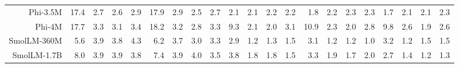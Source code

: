 \documentclass[letterpaper]{article}
\begin{document}
\begin{table}[t]
{\begin{tabular}{rrrrr|rrrr|rrrr|rrrr|rrrr}
Phi-3.5M & \cellcolor[HTML]{CEE8CC}17.4 & \cellcolor[HTML]{F9D4CC}2.7 & \cellcolor[HTML]{F9D3CC}2.6 & \cellcolor[HTML]{FAD4CC}2.9 & \cellcolor[HTML]{CEE8CC}17.9 & \cellcolor[HTML]{FAD4CC}2.9 & \cellcolor[HTML]{F9D3CC}2.5 & \cellcolor[HTML]{F9D4CC}2.7 & \cellcolor[HTML]{FAD8CC}2.1 & \cellcolor[HTML]{FAD9CC}2.1 & \cellcolor[HTML]{FBDACC}2.2 & \cellcolor[HTML]{FBDACC}2.2 & \cellcolor[HTML]{FAD7CC}1.8 & \cellcolor[HTML]{FBDACC}2.2 & \cellcolor[HTML]{FBDBCC}2.3 & \cellcolor[HTML]{FBDBCC}2.3 & \cellcolor[HTML]{FAD7CC}1.7 & \cellcolor[HTML]{FBDACC}2.1 & \cellcolor[HTML]{FBDACC}2.1 & \cellcolor[HTML]{FBDCCC}2.3 \\
Phi-4M & \cellcolor[HTML]{CCE8CC}17.7 & \cellcolor[HTML]{FAD6CC}3.3 & \cellcolor[HTML]{FAD6CC}3.1 & \cellcolor[HTML]{FAD7CC}3.4 & \cellcolor[HTML]{CCE8CC}18.2 & \cellcolor[HTML]{FAD6CC}3.2 & \cellcolor[HTML]{F9D4CC}2.8 & \cellcolor[HTML]{FAD6CC}3.3 & \cellcolor[HTML]{CCE8CC}9.3 & \cellcolor[HTML]{FAD9CC}2.1 & \cellcolor[HTML]{FAD7CC}2.0 & \cellcolor[HTML]{FCE1CC}3.1 & \cellcolor[HTML]{CCE8CC}10.9 & \cellcolor[HTML]{FBDBCC}2.3 & \cellcolor[HTML]{FAD8CC}2.0 & \cellcolor[HTML]{FBDFCC}2.8 & \cellcolor[HTML]{CCE8CC}9.8 & \cellcolor[HTML]{FBDECC}2.6 & \cellcolor[HTML]{FAD8CC}1.9 & \cellcolor[HTML]{FBDECC}2.6 \\
SmolLM-360M & \cellcolor[HTML]{FCE1CC}5.6 & \cellcolor[HTML]{FAD9CC}3.9 & \cellcolor[HTML]{FAD9CC}3.8 & \cellcolor[HTML]{FBDBCC}4.3 & \cellcolor[HTML]{FCE3CC}6.2 & \cellcolor[HTML]{FAD8CC}3.7 & \cellcolor[HTML]{FAD5CC}3.0 & \cellcolor[HTML]{FAD6CC}3.3 & \cellcolor[HTML]{FCE0CC}2.9 & \cellcolor[HTML]{F9D1CC}1.2 & \cellcolor[HTML]{F9D1CC}1.3 & \cellcolor[HTML]{F9D4CC}1.5 & \cellcolor[HTML]{FCE1CC}3.1 & \cellcolor[HTML]{F9D3CC}1.2 & \cellcolor[HTML]{F9D3CC}1.2 & \cellcolor[HTML]{F9D2CC}1.0 & \cellcolor[HTML]{FCE3CC}3.2 & \cellcolor[HTML]{F9D3CC}1.2 & \cellcolor[HTML]{FAD5CC}1.5 & \cellcolor[HTML]{FAD5CC}1.5 \\
SmolLM-1.7B & \cellcolor[HTML]{FEECCC}8.0 & \cellcolor[HTML]{FAD9CC}3.9 & \cellcolor[HTML]{FAD9CC}3.9 & \cellcolor[HTML]{FAD9CC}3.8 & \cellcolor[HTML]{FDE8CC}7.4 & \cellcolor[HTML]{FAD9CC}3.9 & \cellcolor[HTML]{FAD9CC}4.0 & \cellcolor[HTML]{FAD7CC}3.5 & \cellcolor[HTML]{FDE7CC}3.8 & \cellcolor[HTML]{FAD5CC}1.8 & \cellcolor[HTML]{FAD6CC}1.8 & \cellcolor[HTML]{F9D3CC}1.5 & \cellcolor[HTML]{FCE2CC}3.3 & \cellcolor[HTML]{FAD8CC}1.9 & \cellcolor[HTML]{FAD6CC}1.7 & \cellcolor[HTML]{FAD9CC}2.0 & \cellcolor[HTML]{FBDFCC}2.7 & \cellcolor[HTML]{F9D4CC}1.4 & \cellcolor[HTML]{F9D3CC}1.2 & \cellcolor[HTML]{F9D3CC}1.3 \\

\end{tabular}}
\end{table}
\end{document}
